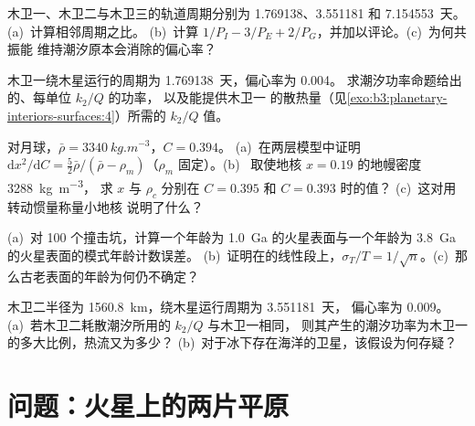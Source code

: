\begin{exercise}[$\star\star$]\label{exo:b3:planetary-interiors-surfaces:8}
木卫一、木卫二与木卫三的轨道周期分别为 1.769138、3.551181 和
\num{7.154553}~天。(a)~计算相邻周期之比。
(b)~计算 $1/P_I - 3/P_E + 2/P_G$，并加以评论。(c)~为何共振能
维持潮汐原本会消除的偏心率？
\end{exercise}

\begin{exercise}[$\star\star$]\label{exo:b3:planetary-interiors-surfaces:9}
木卫一绕木星运行的周期为 \num{1.769138}~天，偏心率为 0.004。
求潮汐功率命题给出的、每单位 $k_2/Q$ 的功率，
以及能提供木卫一
的散热量（见\cref{exo:b3:planetary-interiors-surfaces:4}）所需的 $k_2/Q$ 值。
\end{exercise}

\begin{exercise}[$\star\star\star$]\label{exo:b3:planetary-interiors-surfaces:10}
对月球，$\bar\rho = \qty{3340}{kg.m^{-3}}$，$C = 0.394$。
(a)~在两层模型中证明 $\mathrm dx^2/\mathrm dC =
\tfrac52\bar\rho/(\bar\rho - \rho_m)$（$\rho_m$ 固定）。(b)~
取使地核 $x = 0.19$ 的地幔密度 \qty{3288}{kg.m^{-3}}，
求 $x$ 与 $\rho_c$ 分别在 $C = 0.395$ 和 $C = 0.393$ 时的值？
(c)~这对用转动惯量称量小地核
说明了什么？
\end{exercise}

\begin{exercise}[$\star\star\star$]\label{exo:b3:planetary-interiors-surfaces:11}
(a)~对 100 个撞击坑，计算一个年龄为
\qty{1.0}{Ga} 的火星表面与一个年龄为 \qty{3.8}{Ga} 的火星表面的模式年龄计数误差。
(b)~证明在的线性段上，$\sigma_T/T =
1/\sqrt n$。(c)~那么古老表面的年龄为何仍不确定？
\end{exercise}

\begin{exercise}[$\star\star\star$]\label{exo:b3:planetary-interiors-surfaces:12}
木卫二半径为 \qty{1560.8}{km}，绕木星运行周期为 \num{3.551181}~天，
偏心率为 0.009。(a)~若木卫二耗散潮汐所用的 $k_2/Q$ 与木卫一相同，
则其产生的潮汐功率为木卫一的多大比例，热流又为多少？
(b)~对于冰下存在海洋的卫星，该假设为何存疑？
\end{exercise}

\section{问题：火星上的两片平原}

